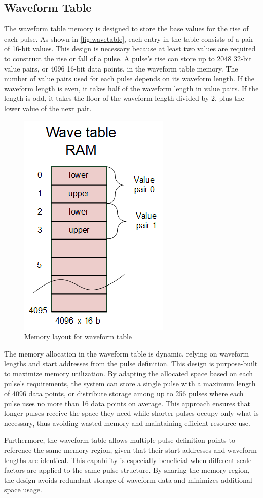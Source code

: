 \subsection{Waveform Table}
The waveform table memory is designed to store the base values for the rise of each pulse. As shown in \autoref{fig:wavetable}, each entry in the table consists of a pair of 16-bit values. This design is necessary because at least two values are required to construct the rise or fall of a pulse. A pulse's rise can store up to 2048 32-bit value pairs, or 4096 16-bit data points, in the waveform table memory. The number of value pairs used for each pulse depends on its waveform length. If the waveform length is even, it takes half of the waveform length in value pairs. If the length is odd, it takes the floor of the waveform length divided by 2, plus the lower value of the next pair.
\begin{figure}[htbp]
    \centering
    \includegraphics[width=0.30\linewidth]{figures/3.3.png}
    \caption{Memory layout for waveform table}
    \label{fig:wavetable}
\end{figure}
The memory allocation in the waveform table is dynamic, relying on waveform lengths and start addresses from the pulse definition. This design is purpose-built to maximize memory utilization. By adapting the allocated space based on each pulse's requirements, the system can store a single pulse with a maximum length of 4096 data points, or distribute storage among up to 256 pulses where each pulse uses no more than 16 data points on average. This approach ensures that longer pulses receive the space they need while shorter pulses occupy only what is necessary, thus avoiding wasted memory and maintaining efficient resource use.

Furthermore, the waveform table allows multiple pulse definition points to reference the same memory region, given that their start addresses and waveform lengths are identical. This capability is especially beneficial when different scale factors are applied to the same pulse structure. By sharing the memory region, the design avoids redundant storage of waveform data and minimizes additional space usage. 

